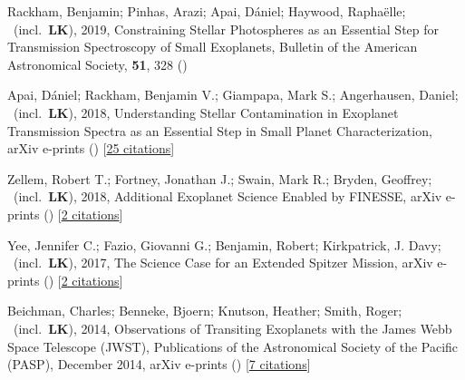 \item[{\color{numcolor}\scriptsize5}] Rackham, Benjamin; Pinhas, Arazi; Apai, D{\'a}niel; Haywood, Rapha{\"e}lle; \etal\ (incl.\ \textbf{LK}), 2019, Constraining Stellar Photospheres as an Essential Step for Transmission Spectroscopy of Small Exoplanets, Bulletin of the American Astronomical Society, \textbf{51}, 328 ()

\item[{\color{numcolor}\scriptsize4}] Apai, D{\'a}niel; Rackham, Benjamin V.; Giampapa, Mark S.; Angerhausen, Daniel; \etal\ (incl.\ \textbf{LK}), 2018, Understanding Stellar Contamination in Exoplanet Transmission Spectra as an Essential Step in Small Planet Characterization, arXiv e-prints () [\href{https://ui.adsabs.harvard.edu/abs/2018arXiv180308708A}{25 citations}]

\item[{\color{numcolor}\scriptsize3}] Zellem, Robert T.; Fortney, Jonathan J.; Swain, Mark R.; Bryden, Geoffrey; \etal\ (incl.\ \textbf{LK}), 2018, Additional Exoplanet Science Enabled by FINESSE, arXiv e-prints () [\href{https://ui.adsabs.harvard.edu/abs/2018arXiv180307163Z}{2 citations}]

\item[{\color{numcolor}\scriptsize2}] Yee, Jennifer C.; Fazio, Giovanni G.; Benjamin, Robert; Kirkpatrick, J. Davy; \etal\ (incl.\ \textbf{LK}), 2017, The Science Case for an Extended Spitzer Mission, arXiv e-prints () [\href{https://ui.adsabs.harvard.edu/abs/2017arXiv171004194Y}{2 citations}]

\item[{\color{numcolor}\scriptsize1}] Beichman, Charles; Benneke, Bjoern; Knutson, Heather; Smith, Roger; \etal\ (incl.\ \textbf{LK}), 2014, Observations of Transiting Exoplanets with the James Webb Space Telescope (JWST), Publications of the Astronomical Society of the Pacific (PASP), December 2014, arXiv e-prints () [\href{https://ui.adsabs.harvard.edu/abs/2014arXiv1411.1754B}{7 citations}]